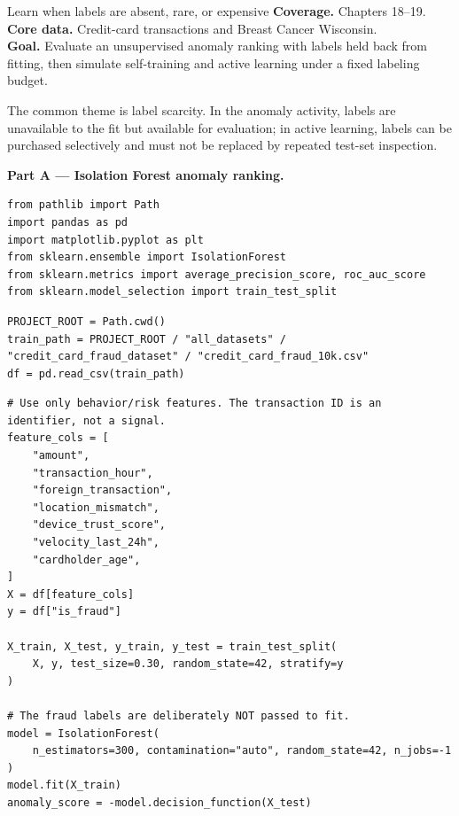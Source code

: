 
\begin{labproject}{Learn when labels are absent, rare, or expensive}
\textbf{Coverage.} Chapters 18--19.\\
\textbf{Core data.} Credit-card transactions and Breast Cancer Wisconsin.\\
\textbf{Goal.} Evaluate an unsupervised anomaly ranking with labels held back from fitting, then simulate self-training and active learning under a fixed labeling budget.

\begin{labmode}
The common theme is label scarcity. In the anomaly activity, labels are unavailable to the fit but available for evaluation; in active learning, labels can be purchased selectively and must not be replaced by repeated test-set inspection.
\end{labmode}

\medskip\noindent\textbf{Part A --- Isolation Forest anomaly ranking.}\par
\begin{lstlisting}[style=mlpython]
from pathlib import Path
import pandas as pd
import matplotlib.pyplot as plt
from sklearn.ensemble import IsolationForest
from sklearn.metrics import average_precision_score, roc_auc_score
from sklearn.model_selection import train_test_split
\end{lstlisting}

\begin{lstlisting}[style=mlpython]
PROJECT_ROOT = Path.cwd()
train_path = PROJECT_ROOT / "all_datasets" / "credit_card_fraud_dataset" / "credit_card_fraud_10k.csv"
df = pd.read_csv(train_path)
\end{lstlisting}

\begin{lstlisting}[style=mlpython]
# Use only behavior/risk features. The transaction ID is an identifier, not a signal.
feature_cols = [
    "amount",
    "transaction_hour",
    "foreign_transaction",
    "location_mismatch",
    "device_trust_score",
    "velocity_last_24h",
    "cardholder_age",
]
X = df[feature_cols]
y = df["is_fraud"]

X_train, X_test, y_train, y_test = train_test_split(
    X, y, test_size=0.30, random_state=42, stratify=y
)

# The fraud labels are deliberately NOT passed to fit.
model = IsolationForest(
    n_estimators=300, contamination="auto", random_state=42, n_jobs=-1
)
model.fit(X_train)
anomaly_score = -model.decision_function(X_test)


\end{lstlisting}
\end{labproject}
